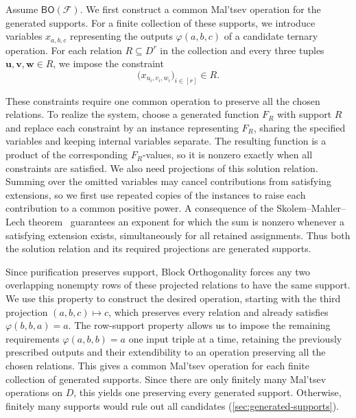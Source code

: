 \documentclass[11pt,letterpaper,onecolumn]{article}
\theoremstyle{plain}
\theoremstyle{definition}
\theoremstyle{remark}
\newcommand{\cF}{\mathcal F}
\newcommand{\BO}{\mathsf{BO}}
\begin{document}
Assume $\BO(\cF)$.  We first construct a common Mal'tsev operation for the
generated supports.  For a finite collection of these supports, we introduce
variables $x_{a,b,c}$ representing the outputs $\varphi(a,b,c)$ of a candidate
ternary operation.  For each relation $R\subseteq D^r$ in the collection
and every three tuples $\mathbf u,\mathbf v,\mathbf w\in R$, we impose
the constraint
\[
  \bigl(x_{u_i,v_i,w_i}\bigr)_{i\in[r]}\in R.
\]

These constraints require one common operation to preserve all the chosen
relations.  To realize the system, choose a generated function $F_R$ with
support $R$ and replace each constraint by an instance representing $F_R$,
sharing the specified variables and keeping internal variables separate.
The resulting function is a product of the corresponding $F_R$-values,
so it is nonzero exactly when all constraints are satisfied.  We also need
projections of this solution relation.  Summing over the omitted variables
may cancel contributions from satisfying extensions, so we first use
repeated copies of the instances to raise each contribution to a common
positive power.  A consequence of the Skolem--Mahler--Lech
theorem~\cite{Lech1953} guarantees an exponent for which the sum is nonzero
whenever a satisfying extension exists, simultaneously for all retained
assignments.  Thus both the solution relation and its required projections
are generated supports.

Since purification preserves support, Block Orthogonality forces any two
overlapping nonempty rows of these projected relations to have the same
support.  We use this property to construct the desired operation, starting
with the third projection $(a,b,c)\mapsto c$, which preserves every relation
and already satisfies $\varphi(b,b,a)=a$.  The row-support property allows
us to impose the remaining requirements $\varphi(a,b,b)=a$ one input triple
at a time, retaining the previously prescribed outputs and their
extendibility to an operation preserving all the chosen relations.  This
gives a common Mal'tsev operation for each finite collection of generated
supports.  Since there are only finitely many Mal'tsev operations on $D$,
this yields one preserving every generated support.  Otherwise, finitely
many supports would rule out all candidates (\cref{sec:generated-supports}).
\end{document}
